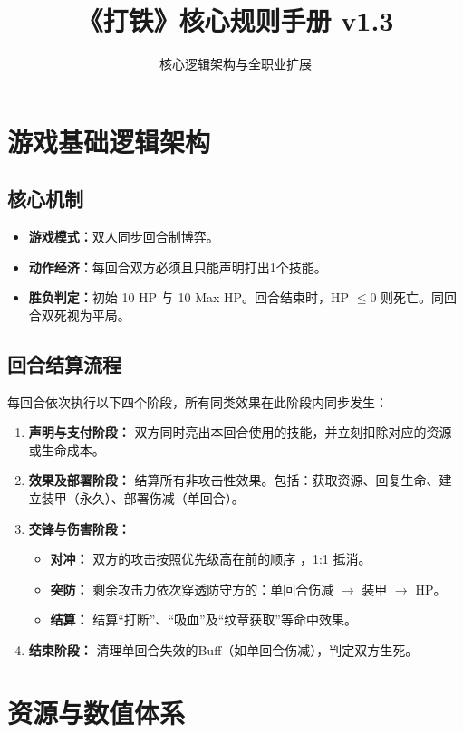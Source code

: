 \documentclass[a4paper,10pt]{ctexart}
\title{《打铁》核心规则手册 v1.3}
\author{核心逻辑架构与全职业扩展}
\date{}
\begin{document}
\maketitle

\section{游戏基础逻辑架构}

\subsection{核心机制}
\begin{itemize}
    \item \textbf{游戏模式：}双人同步回合制博弈。
    \item \textbf{动作经济：}每回合双方必须且只能声明打出1个技能。
    \item \textbf{胜负判定：}初始 10 HP 与 10 Max HP。回合结束时，HP $\le 0$ 则死亡。同回合双死视为平局。
\end{itemize}

\subsection{回合结算流程}
每回合依次执行以下四个阶段，所有同类效果在此阶段内同步发生：

\begin{enumerate}
    \item \textbf{声明与支付阶段：}
    双方同时亮出本回合使用的技能，并立刻扣除对应的资源或生命成本。
    \item \textbf{效果及部署阶段：}
    结算所有非攻击性效果。包括：获取资源、回复生命、建立装甲（永久）、部署伤减（单回合）。
    \item \textbf{交锋与伤害阶段：}
    \begin{itemize}
        \item \textbf{对冲：} 双方的攻击按照优先级高在前的顺序 ，1:1 抵消。
        \item \textbf{突防：} 剩余攻击力依次穿透防守方的：单回合伤减 $\rightarrow$ 装甲 $\rightarrow$ HP。
        \item \textbf{结算：} 结算“打断”、“吸血”及“纹章获取”等命中效果。
    \end{itemize}
    \item \textbf{结束阶段：}
    清理单回合失效的Buff（如单回合伤减），判定双方生死。
\end{enumerate}

\section{资源与数值体系}
\end{document}
